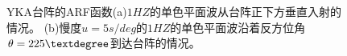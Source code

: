 \begin{figure}[tbph]
\hfill{}
\hfill{}
\hfill{}
\caption{YKA台阵的ARF函数(a)$1HZ$的单色平面波从台阵正下方垂直入射的情况。%
(b)慢度$u=5 s/deg$的$1HZ$的单色平面波沿着反方位角$\theta = 225\textdegree$到达台阵的情况。}
\label{yka}
\end{figure}

